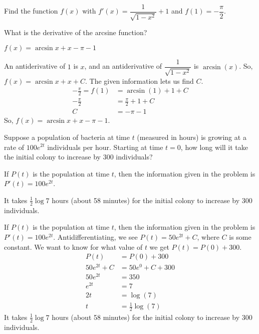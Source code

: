 \begin{question}\label{s4.1initlast}
Find the function $f(x)$ with $f'(x)=\dfrac{1}{\sqrt{1-x^2}}+1$ and $f(1)=-\dfrac{\pi}{2}$.
\end{question}
\begin{hint}
What is the derivative of the arcsine function?
\end{hint}
\begin{answer}
$f(x)=\arcsin x+x - \pi-1$
\end{answer}
\begin{solution}
An antiderivative of  $1$ is $x$, and an antiderivative of $\dfrac{1}{\sqrt{1-x^2}}$ is $\arcsin(x)$. So, $f(x)=\arcsin x + x +C$. The given information lets us find $C$.
\begin{align*}
-\frac{\pi}{2}=f(1)&=\arcsin(1)+1+C\\
-\frac{\pi}{2}&=\frac{\pi}{2}+1+C\\
C&=-\pi-1
\end{align*}
So, $f(x)=\arcsin x+x - \pi-1$.
\end{solution}



\begin{Mquestion}\label{s4.1applyfirst}
Suppose a population of bacteria at time $t$ (measured in hours) is growing at a rate of $100e^{2t}$ individuals per hour. Starting at time $t=0$, how long will it take the initial colony to increase by 300 individuals?
\end{Mquestion}
\begin{hint}
If $P(t)$ is the population at time $t$, then the information given in the problem is
$P'(t)=100e^{2t}$.
\end{hint}
\begin{answer}
It takes $\frac{1}{2}\log 7$ hours (about 58 minutes) for the initial colony to increase by 300 individuals.
\end{answer}
\begin{solution}
If $P(t)$ is the population at time $t$, then the information given in the problem is
$P'(t)=100e^{2t}$. Antidifferentiating, we see $P(t)=50e^{2t}+C$, where $C$ is some constant. We want to know for what value of $t$ we get $P(t)=P(0)+300$.
\begin{align*}
P(t)&=P(0)+300\\
50e^{2t}+C&=50e^{0}+C+300\\
50e^{2t}&=350\\
e^{2t}&=7\\
2t&=\log(7 )\\
t&=\frac{1}{2}\log(7)
\end{align*}
It takes $\frac{1}{2}\log 7$ hours (about 58 minutes) for the initial colony to increase by 300 individuals.
\end{solution}



